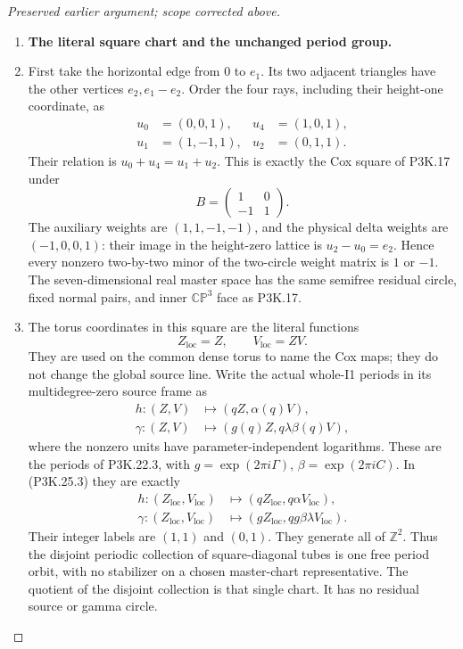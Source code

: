 \begin{proof}[Preserved earlier argument; scope corrected above]
\begin{enumerate}[label=\arabic*.]
\item \par\medskip\noindent\textbf{The literal square chart and the unchanged period group.}\enspace

\item First take the horizontal edge from \(0\) to \(e_1\). Its two
adjacent triangles have the other vertices \(e_2,e_1-e_2\).
Order the four rays, including their height-one coordinate, as
\[
\begin{aligned}
 u_0&=(0,0,1),&u_4&=(1,0,1),\\
 u_1&=(1,-1,1),&u_2&=(0,1,1).
\end{aligned}
                                                        \tag{P3K.25.2}
\]
Their relation is \(u_0+u_4=u_1+u_2\). This is exactly the Cox
square of P3K.17 under
\[
 B=\begin{pmatrix}1&0\\-1&1\end{pmatrix}.
\]
The auxiliary weights are \((1,1,-1,-1)\), and the physical
delta weights are \((-1,0,0,1)\): their image in the height-zero
lattice is \(u_2-u_0=e_2\). Hence every nonzero two-by-two
minor of the two-circle weight matrix is \(1\) or \(-1\).
The seven-dimensional real master space has the same semifree
residual circle, fixed normal pairs, and inner \(\mathbb{CP}^3\)
face as P3K.17.

\item The torus coordinates in this square are the literal functions
\[
                  Z_{\mathrm{loc}}=Z,\qquad
                  V_{\mathrm{loc}}=ZV.                 \tag{P3K.25.3}
\]
They are used on the common dense torus to name the Cox maps;
they do not change the global source line. Write the actual
whole-I1 periods in its multidegree-zero source frame as
\[
\begin{aligned}
 h:(Z,V)&\longmapsto(qZ,\alpha(q)V),\\
 \gamma:(Z,V)&\longmapsto(g(q)Z,q\lambda\beta(q)V),
\end{aligned}
                                                        \tag{P3K.25.4}
\]
where the nonzero units have parameter-independent logarithms.
These are the periods of P3K.22.3, with
\(g=\exp(2\pi i\Gamma)\), \(\beta=\exp(2\pi iC)\).
In (P3K.25.3) they are exactly
\[
\begin{aligned}
 h:(Z_{\mathrm{loc}},V_{\mathrm{loc}})
       &\longmapsto(qZ_{\mathrm{loc}},q\alpha V_{\mathrm{loc}}),\\
 \gamma:(Z_{\mathrm{loc}},V_{\mathrm{loc}})
       &\longmapsto(gZ_{\mathrm{loc}},
                          qg\beta\lambda V_{\mathrm{loc}}).
\end{aligned}
                                                        \tag{P3K.25.5}
\]
Their integer labels are \((1,1)\) and \((0,1)\).
They generate all of \(\mathbb Z^2\). Thus the disjoint periodic
collection of square-diagonal tubes is one free period orbit,
with no stabilizer on a chosen master-chart representative.
The quotient of the disjoint collection is that single chart.
It has no residual source or gamma circle.


\end{enumerate}
\end{proof}
